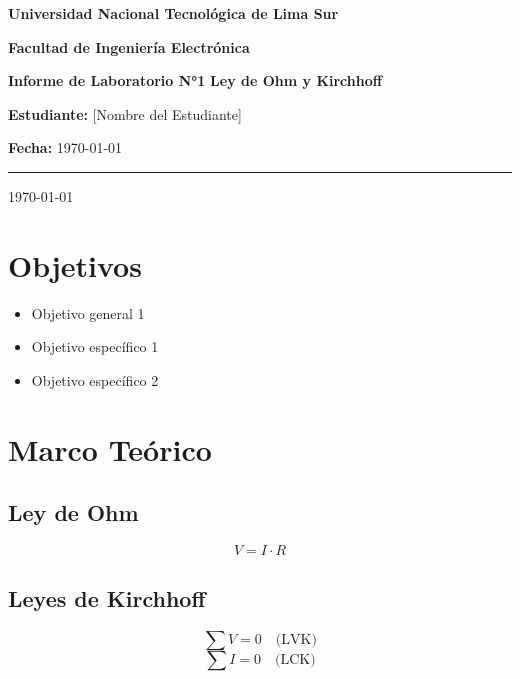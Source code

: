\documentclass[12pt,letterpaper]{article}
\newcommand{\labnumero}{1}
\newcommand{\labtitulo}{Ley de Ohm y Kirchhoff}
\newcommand{\autor}{[Nombre del Estudiante]}
\newcommand{\fecha}{\today}
\begin{document}
\begin{titlepage}
    \centering
    {\Large \textbf{Universidad Nacional Tecnológica de Lima Sur}}
    \vspace{0.5cm}
    
    {\large \textbf{Facultad de Ingeniería Electrónica}}
    \vspace{1cm}
    
    {\Huge \textbf{Informe de Laboratorio N°\labnumero}}
    \vspace{0.3cm}
    {\huge \textbf{\labtitulo}}
    \vspace{1.5cm}
    
    {\large \textbf{Estudiante:} \autor}
    \vspace{0.3cm}
    
    {\large \textbf{Fecha:} \fecha}
    \vspace{1cm}
    
    \rule{0.6\textwidth}{0.5pt}
    
    \vfill
    {\small \today}
\end{titlepage}

\tableofcontents
\newpage

\section{Objetivos}
\begin{itemize}
    \item Objetivo general 1
    \item Objetivo específico 1
    \item Objetivo específico 2
\end{itemize}

\section{Marco Teórico}
\subsection{Ley de Ohm}
\begin{equation}
    V = I \cdot R
    \label{eq:ohm}
\end{equation}

\subsection{Leyes de Kirchhoff}
\begin{equation}
    \sum V = 0 \quad \text{(LVK)}
\end{equation}
\begin{equation}
    \sum I = 0 \quad \text{(LCK)}
\end{equation}
\end{document}
